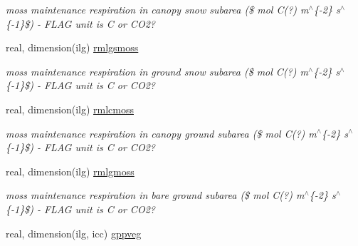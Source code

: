 \begin{DoxyCompactItemize}
\begin{DoxyCompactList}\small\item\em moss maintenance respiration in canopy snow subarea (\$ mol C(?) m$^\wedge$\{-\/2\} s$^\wedge$\{-\/1\}\$) -\/ F\+L\+A\+G unit is C or C\+O2? \end{DoxyCompactList}\item 
\hypertarget{structctem__statevars_1_1veg__gat_a13837107586848cdf708ca7d97047fd5}{}real, dimension(ilg) \hyperlink{structctem__statevars_1_1veg__gat_a13837107586848cdf708ca7d97047fd5}{rmlgsmoss}\label{structctem__statevars_1_1veg__gat_a13837107586848cdf708ca7d97047fd5}

\begin{DoxyCompactList}\small\item\em moss maintenance respiration in ground snow subarea (\$ mol C(?) m$^\wedge$\{-\/2\} s$^\wedge$\{-\/1\}\$) -\/ F\+L\+A\+G unit is C or C\+O2? \end{DoxyCompactList}\item 
\hypertarget{structctem__statevars_1_1veg__gat_a6c138212d6d5f165f401cf9109f75513}{}real, dimension(ilg) \hyperlink{structctem__statevars_1_1veg__gat_a6c138212d6d5f165f401cf9109f75513}{rmlcmoss}\label{structctem__statevars_1_1veg__gat_a6c138212d6d5f165f401cf9109f75513}

\begin{DoxyCompactList}\small\item\em moss maintenance respiration in canopy ground subarea (\$ mol C(?) m$^\wedge$\{-\/2\} s$^\wedge$\{-\/1\}\$) -\/ F\+L\+A\+G unit is C or C\+O2? \end{DoxyCompactList}\item 
\hypertarget{structctem__statevars_1_1veg__gat_a1b444eb1fd23d9db75733a4025cc16dc}{}real, dimension(ilg) \hyperlink{structctem__statevars_1_1veg__gat_a1b444eb1fd23d9db75733a4025cc16dc}{rmlgmoss}\label{structctem__statevars_1_1veg__gat_a1b444eb1fd23d9db75733a4025cc16dc}

\begin{DoxyCompactList}\small\item\em moss maintenance respiration in bare ground subarea (\$ mol C(?) m$^\wedge$\{-\/2\} s$^\wedge$\{-\/1\}\$) -\/ F\+L\+A\+G unit is C or C\+O2? \end{DoxyCompactList}\item 
\hypertarget{structctem__statevars_1_1veg__gat_a591d47bd50185af4c1b625cc976162f3}{}real, dimension(ilg, icc) \hyperlink{structctem__statevars_1_1veg__gat_a591d47bd50185af4c1b625cc976162f3}{gppveg}\label{structctem__statevars_1_1veg__gat_a591d47bd50185af4c1b625cc976162f3}


\end{DoxyCompactItemize}
